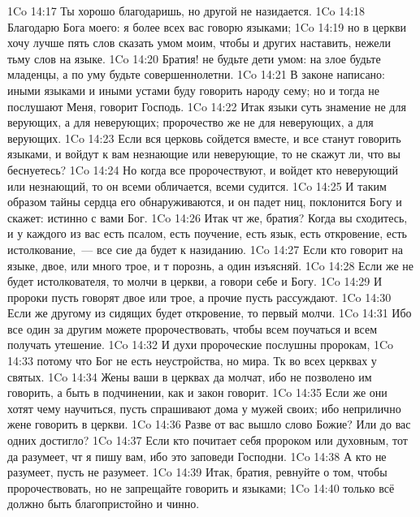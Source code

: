 \vs 1Co 14:17 Ты хорошо благодаришь, но другой не назидается.
\vs 1Co 14:18 Благодарю Бога моего: я более всех вас говорю языками;
\vs 1Co 14:19 но в церкви хочу лучше пять слов сказать умом моим, чтобы и других наставить, нежели тьму слов на  языке.
\rsbpar\vs 1Co 14:20 Братия! не будьте дети умом: на злое будьте младенцы, а по уму будьте совершеннолетни.
\vs 1Co 14:21 В законе написано: иными языками и иными устами буду говорить народу сему; но и тогда не послушают Меня, говорит Господь.
\vs 1Co 14:22 Итак языки суть знамение не для верующих, а для неверующих; пророчество же не для неверующих, а для верующих.
\vs 1Co 14:23 Если вся церковь сойдется вместе, и все станут говорить  языками, и войдут к вам незнающие или неверующие, то не скажут ли, что вы беснуетесь?
\vs 1Co 14:24 Но когда все пророчествуют, и войдет кто неверующий или незнающий, то он всеми обличается, всеми судится.
\vs 1Co 14:25 И таким образом тайны сердца его обнаруживаются, и он падет ниц, поклонится Богу и скажет: истинно с вами Бог.
\rsbpar\vs 1Co 14:26 Итак чт же, братия? Когда вы сходитесь, и у каждого из вас есть псалом, есть поучение, есть язык, есть откровение, есть истолкование,~--- все сие да будет к назиданию.
\vs 1Co 14:27 Если кто говорит на  языке,  двое, или много трое, и т порознь, а один изъясняй.
\vs 1Co 14:28 Если же не будет истолкователя, то молчи в церкви, а говори себе и Богу.
\vs 1Co 14:29 И пророки пусть говорят двое или трое, а прочие пусть рассуждают.
\vs 1Co 14:30 Если же другому из сидящих будет откровение, то первый молчи.
\vs 1Co 14:31 Ибо все один за другим можете пророчествовать, чтобы всем поучаться и всем получать утешение.
\vs 1Co 14:32 И духи пророческие послушны пророкам,
\vs 1Co 14:33 потому что Бог не есть  неустройства, но мира. Тк  во всех церквах у святых.
\vs 1Co 14:34 Жены ваши в церквах да молчат, ибо не позволено им говорить, а быть в подчинении, как и закон говорит.
\vs 1Co 14:35 Если же они хотят чему научиться, пусть спрашивают  дома у мужей своих; ибо неприлично жене говорить в церкви.
\vs 1Co 14:36 Разве от вас вышло слово Божие? Или до вас одних достигло?
\rsbpar\vs 1Co 14:37 Если кто почитает себя пророком или духовным, тот да разумеет, чт я пишу вам, ибо это заповеди Господни.
\vs 1Co 14:38 А кто не разумеет, пусть не разумеет.
\vs 1Co 14:39 Итак, братия, ревнуйте о том, чтобы пророчествовать, но не запрещайте говорить и языками;
\vs 1Co 14:40 только всё должно быть благопристойно и чинно.
